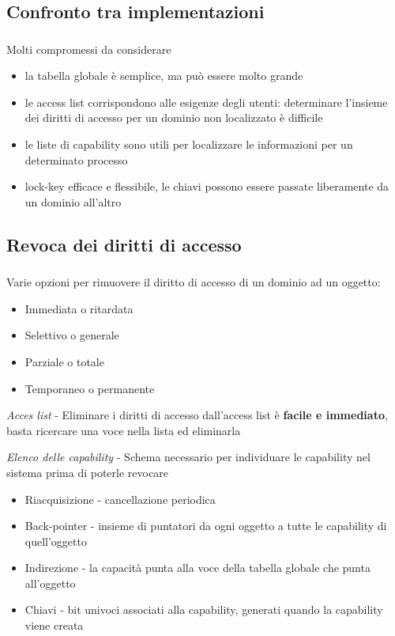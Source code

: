 \documentclass{beamer}
\newenvironment{mainframe}{
	\begin{frame}
		\frametitle{\insertsubsection}
		\framesubtitle{\insertsection}
	}{
	\end{frame}
}
\begin{document}
\subsection{Confronto tra implementazioni}
\begin{mainframe}
	Molti compromessi da considerare
	\begin{itemize}
		\item la tabella globale è semplice, ma può essere molto grande
		\item le access list corrispondono alle esigenze degli utenti: determinare l'insieme dei diritti di accesso per un dominio non localizzato è difficile
		\item le liste di capability sono utili per localizzare le informazioni per un determinato processo
		\item lock-key efficace e flessibile, le chiavi possono essere passate liberamente da un dominio all'altro
	\end{itemize}
\end{mainframe}
\subsection{Revoca dei diritti di accesso}
\begin{mainframe}
	Varie opzioni per rimuovere il diritto di accesso di un dominio ad un oggetto:
	\begin{itemize}
		\item Immediata o ritardata
		\item Selettivo o generale
		\item Parziale o totale
		\item Temporaneo o permanente
	\end{itemize}
	\textit{Acces list} - Eliminare i diritti di accesso dall'access list è \textbf{facile e immediato}, basta ricercare una voce nella lista ed eliminarla\\
\end{mainframe}
\begin{frame}
	\textit{Elenco delle capability} - Schema necessario per individuare le capability nel sistema prima di poterle revocare
	\begin{itemize}
		\item Riacquisizione - cancellazione periodica
		\item Back-pointer - insieme di puntatori da ogni oggetto a tutte le capability di quell'oggetto
		\item Indirezione - la capacità punta alla voce della tabella globale che punta all'oggetto
		\item Chiavi - bit univoci associati alla capability, generati quando la capability viene creata
	\end{itemize}
\end{frame}
\end{document}
